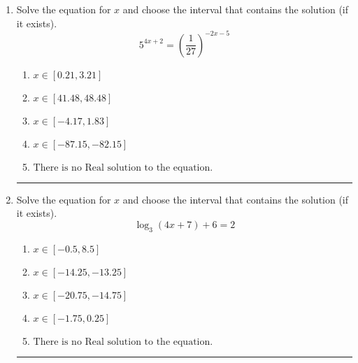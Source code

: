 \documentclass[14pt]{extbook}
\newcommand{\litem}[1]{\item#1\hspace*{-1cm}\rule{\textwidth}{0.4pt}}
\begin{document}
\begin{enumerate}
{\begin{enumerate}[label=\Alph*.]
\end{enumerate} }
\litem{
Solve the equation for $x$ and choose the interval that contains the solution (if it exists).\[ 5^{4x+2} = \left(\frac{1}{27}\right)^{-2x-5} \]\begin{enumerate}[label=\Alph*.]
\item \( x \in [0.21, 3.21] \)
\item \( x \in [41.48, 48.48] \)
\item \( x \in [-4.17, 1.83] \)
\item \( x \in [-87.15, -82.15] \)
\item \( \text{There is no Real solution to the equation.} \)

\end{enumerate} }
\litem{
Solve the equation for $x$ and choose the interval that contains the solution (if it exists).\[ \log_{3}{(4x+7)}+6 = 2 \]\begin{enumerate}[label=\Alph*.]
\item \( x \in [-0.5, 8.5] \)
\item \( x \in [-14.25, -13.25] \)
\item \( x \in [-20.75, -14.75] \)
\item \( x \in [-1.75, 0.25] \)
\item \( \text{There is no Real solution to the equation.} \)

\end{enumerate} }
\end{enumerate}
\end{document}
